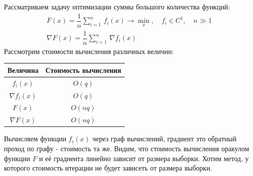 Рассматриваем задачу оптимизации суммы большого количества функций:
\begin{gather*}
    F(x) = \dfrac{1}{n} \sum\limits_{i=1}^{n} \, f_{i} (x) \to \min\limits_{x}, \quad f_{i} \in C^{1}, \quad n \gg 1 \\
    \nabla F(x) = \dfrac{1}{n} \sum\limits_{i=1}^{n} \, \nabla f_{i} (x)
\end{gather*}
Рассмотрим стоимости вычисления различных величин:
\begin{center}
    \begin{tabular}{|c|c|}
        \hline
        Величина       & Стоимость вычисления \\
        \hline
        $f_{i}(x)$        & $O(q)$               \\
        \hline
        $\nabla f_{i}(x)$ & $O(q)$               \\
        \hline
        $F(x)$            & $O(nq)$              \\
        \hline
        $\nabla F(x)$     & $O(nq)$              \\
        \hline
    \end{tabular}
\end{center}
Вычисляем функции $f_{i}(x)$ через граф вычислений, градиент это обратный проход по графу - стоимость та же. Видим, что стоимость вычисления оракулом функции $F$ и её градиента линейно зависит от размера выборки. Хотим метод, у которого стоимость итерации не будет зависеть от размера выборки.

